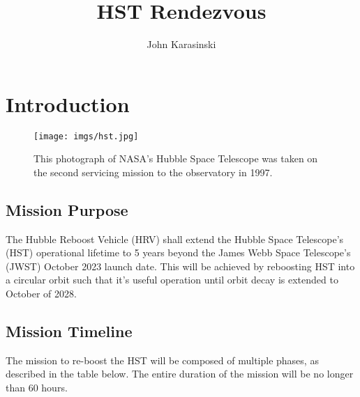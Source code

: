 \documentclass[onecolumn,10pt]{jhwhw}
\author{John Karasinski}
\title{HST Rendezvous}
\begin{document}

\chapter{Introduction}


\begin{figure}[tbh]
\begin{center}
\texttt{[image: imgs/hst.jpg]}
\caption{This photograph of NASA's Hubble Space Telescope was taken on the second servicing mission to the observatory in 1997.}
\label{fig:density}
\end{center}
\end{figure}

\section{Mission Purpose}
The Hubble Reboost Vehicle (HRV) shall extend the Hubble Space Telescope's (HST) operational lifetime to 5 years beyond the James Webb Space Telescope's (JWST) October 2023 launch date. This will be achieved by reboosting HST into a circular orbit such that it's useful operation until orbit decay is extended to October of 2028.

\section{Mission Timeline}
The mission to re-boost the HST will be composed of multiple phases, as described in the table below. The entire duration of the mission will be no longer than 60 hours.
\end{document}
